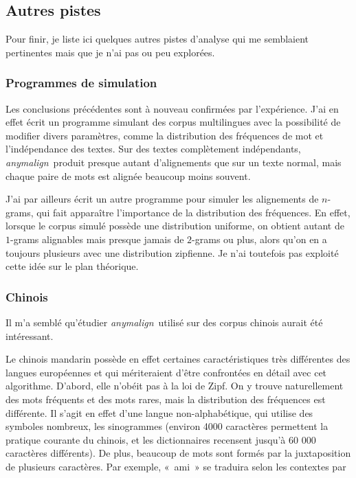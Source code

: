 \documentclass[a4paper,10pt]{article}
\newcommand{\anym}{\emph{anymalign}}
\newcommand{\guill}[1]{«~#1~»}
\begin{document}

\subsection{Autres pistes}

Pour finir, je liste ici quelques autres pistes d'analyse qui me semblaient pertinentes mais que je n'ai pas ou peu explorées.

\subsubsection{Programmes de simulation}

Les conclusions précédentes sont à nouveau confirmées par l'expérience. J'ai en effet écrit un programme simulant des corpus multilingues avec la possibilité de modifier divers paramètres, comme la distribution des fréquences de mot et l'indépendance des textes. Sur des textes complètement indépendants, \anym~produit presque autant d'alignements que sur un texte normal, mais chaque paire de mots est alignée beaucoup moins souvent.

J'ai par ailleurs écrit un autre programme pour simuler les alignements de $n$-grams, qui fait apparaître l'importance de la distribution des fréquences. En effet, lorsque le corpus simulé possède une distribution uniforme, on obtient autant de $1$-grams alignables mais presque jamais de $2$-grams ou plus, alors qu'on en a toujours plusieurs avec une distribution zipfienne. Je n'ai toutefois pas exploité cette idée sur le plan théorique.

\subsubsection{Chinois}

Il m'a semblé qu'étudier \anym~utilisé sur des corpus chinois aurait été intéressant.

Le chinois mandarin possède en effet certaines caractéristiques très différentes des langues européennes et qui mériteraient d'être confrontées en détail avec cet algorithme. D'abord, elle n'obéit pas à la loi de Zipf. On y trouve naturellement des mots fréquents et des mots rares, mais la distribution des fréquences est différente. Il s'agit en effet d'une langue non-alphabétique, qui utilise des symboles nombreux, les sinogrammes (environ 4000 caractères permettent la pratique courante du chinois, et les dictionnaires recensent jusqu'à 60 000 caractères différents). De plus, beaucoup de mots sont formés par la juxtaposition de plusieurs caractères. Par exemple, \guill{ami} se traduira selon les contextes par 
\end{document}
